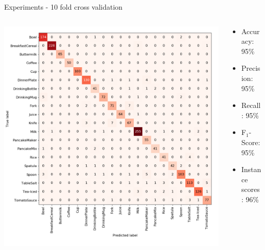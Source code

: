 \documentclass[]{beamer}
\begin{document}
\begin{frame}{Experiments - 10 fold cross validation}
\begin{columns}
	\begin{column}{0.7\textwidth}
		\includegraphics[scale=.3]{../thesis/img/chapter6/UnrealGTClass.png}
	\end{column}
	\quad
	\begin{column}{0.3\textwidth}
		\begin{itemize}
			\item Accuracy: 95\%
			\item Precision: 95\%
			\item Recall: 95\%
			\item F$_{1}$-Score: 95\%
			\bigskip
			\item Instance scores: 96\%
		\end{itemize}
	\end{column}
\end{columns}
\end{frame}
\end{document}
